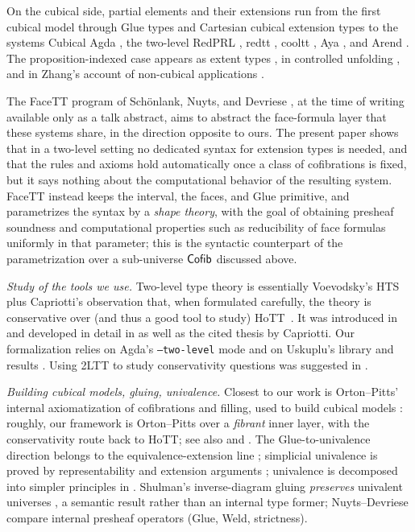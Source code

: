 On the
cubical side, partial elements and their extensions run from the first
cubical model \citep{BCH2014} through Glue types \citep{CoquandTalk,CCHM2018}
and Cartesian cubical extension types \citep{angiuli2019computational} to the
systems Cubical Agda \citep{CubicalAgda}, the two-level RedPRL \citep{RedPRL2018},
redtt \citep{redtt}, cooltt \citep{cooltt}, Aya \citep{aya}, and
Arend \citep{arend}. The proposition-indexed case appears as extent
types \citep{sterling2022first,sterling2021logical}, in controlled unfolding
\citep{gratzer2022controlling}, and in Zhang's account of non-cubical
applications \citep{zhang2023three}.

The FaceTT program of Sch\"onlank, Nuyts, and Devriese
\citep{facett_types_talk}, at the time of writing available only as a talk
abstract, aims to abstract the face-formula layer that these systems share, in
the direction opposite to ours. The present paper shows that in a two-level
setting no dedicated syntax for extension types is needed, and that the rules and
axioms hold automatically once a class of cofibrations is fixed, but it says
nothing about the computational behavior of the resulting system. FaceTT instead
keeps the interval, the faces, and Glue primitive, and parametrizes the syntax by
a \emph{shape theory}, with the goal of obtaining presheaf soundness and
computational properties such as reducibility of face formulas uniformly in that
parameter; this is the syntactic counterpart of the parametrization over a
sub-universe $\mathsf{Cofib}$ discussed above. 

\emph{Study of the tools we use.}
Two-level type theory is essentially Voevodsky's HTS \citep{HTS} plus Capriotti's observation that, when formulated carefully, the theory is conservative over (and thus a good tool to study) HoTT~\citep{Capriotti2017}.
It was introduced in \citet{AltenkirchCapriottiKraus2016}
and developed in detail in \citet{2LTT} as well as the cited thesis by Capriotti.
Our formalization relies on Agda's \texttt{--two-level}
mode \citep{agdareadthedocs} and on Uskuplu's library and results
\citep{2LTTAgda,Uskuplu2025}. Using 2LTT to study conservativity questions was
suggested in \citet{KdJ_representing}.

\emph{Building cubical models, gluing, univalence.}
Closest to our work is Orton--Pitts' internal axiomatization of cofibrations
and filling, used to build cubical models \citep{OrtonPitts2018}: roughly,
our framework is Orton--Pitts over a \emph{fibrant} inner layer, with the
conservativity route back to HoTT; see also
\citet{licata_et_al:LIPIcs.FSCD.2018.22} and \citet{ABCFHL2021}. The Glue-to-univalence
direction belongs to the equivalence-extension line \citep{Sattler2017};
simplicial univalence is proved by representability and extension arguments
\citep{KapulkinLumsdaine2021,GambinoHenry2022}; univalence is decomposed into
simpler principles in \citet{OrtonPitts2017Decomposing}. Shulman's
inverse-diagram gluing \emph{preserves} univalent universes
\citep{Shulman2015InverseDiagrams}, a semantic result rather than an internal type
former; Nuyts--Devriese \citep{NuytsDevriese2020Transpension} compare internal presheaf operators (Glue, Weld,
strictness).

